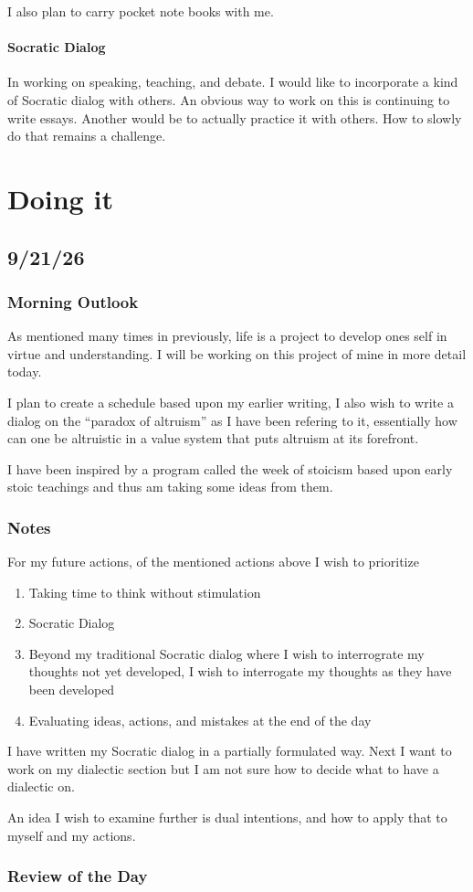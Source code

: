 I also plan to carry pocket note books with me.

\paragraph{Socratic Dialog}

In working on speaking, teaching, and debate. I would like to incorporate a kind of Socratic dialog with others. An obvious way to work on this is continuing to write essays. Another would be to actually practice it with others. How to slowly do that remains a challenge.

\section{Doing it}

\subsection{9/21/26}

\subsubsection{Morning Outlook}

As mentioned many times in previously, life is a project to develop ones self in virtue and understanding. I will be working on this project of mine in more detail today.

I plan to create a schedule based upon my earlier writing, I also wish to write a dialog on the ``paradox of altruism'' as I have been refering to it, essentially how can one be altruistic in a value system that puts altruism at its forefront.

I have been inspired by a program called the week of stoicism based upon early stoic teachings and thus am taking some ideas from them.
\subsubsection{Notes}
For my future actions, of the mentioned actions above I wish to prioritize

\begin{enumerate}
  \item Taking time to think without stimulation
  \item Socratic Dialog
  \item Beyond my traditional Socratic dialog where I wish to interrograte my thoughts not yet developed, I wish to interrogate my thoughts as they have been developed
  \item Evaluating ideas, actions, and mistakes at the end of the day
\end{enumerate}

I have written my Socratic dialog in a partially formulated way. Next I want to work on my dialectic section but I am not sure how to decide what to have a dialectic on.

An idea I wish to examine further is dual intentions, and how to apply that to myself and my actions.
\subsubsection{Review of the Day}
